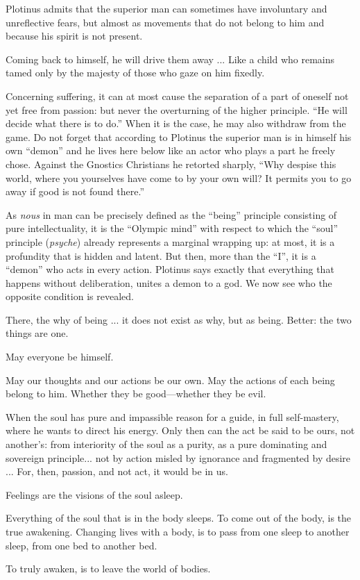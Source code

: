 Plotinus admits that the superior man can sometimes have involuntary and unreflective fears, but almost as movements that do not belong to him and because his spirit is not present.

\begin{quotex}
Coming back to himself, he will drive them away ... Like a child who remains tamed only by the majesty of those who gaze on him fixedly.
\end{quotex}


Concerning suffering, it can at most cause the separation of a part of oneself not yet free from passion: but never the overturning of the higher principle. ``He will decide what there is to do.'' When it is the case, he may also withdraw from the game. Do not forget that according to Plotinus the superior man is in himself his own ``demon'' and he lives here below like an actor who plays a part he freely chose. Against the Gnostics Christians he retorted sharply, ``Why despise this world, where you yourselves have come to by your own will? It permits you to go away if good is not found there.''

As \emph{nous} in man can be precisely defined as the ``being'' principle consisting of pure intellectuality, it is the ``Olympic mind'' with respect to which the ``soul'' principle (\emph{psyche}) already represents a marginal wrapping up: at most, it is a profundity that is hidden and latent. But then, more than the ``I'', it is a ``demon'' who acts in every action. Plotinus says exactly that everything that happens without deliberation, unites a demon to a god. We now see who the opposite condition is revealed.

\begin{quotex}
There, the why of being ... it does not exist as why, but as being. Better: the two things are one.

May everyone be himself.

May our thoughts and our actions be our own. May the actions of each being belong to him. Whether they be good---whether they be evil.

When the soul has pure and impassible reason for a guide, in full self-mastery, where he wants to direct his energy. Only then can the act be said to be ours, not another's: from interiority of the soul as a purity, as a pure dominating and sovereign principle... not by action misled by ignorance and fragmented by desire ... For, then, passion, and not act, it would be in us.

Feelings are the visions of the soul asleep.

Everything of the soul that is in the body sleeps. To come out of the body, is the true awakening. Changing lives with a body, is to pass from one sleep to another sleep, from one bed to another bed.

To truly awaken, is to leave the world of bodies.
\end{quotex}


